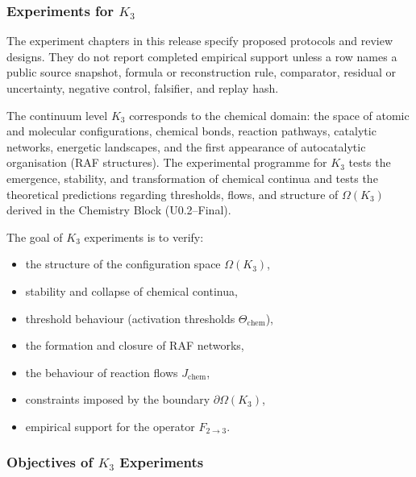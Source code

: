 
\subsubsection{Experiments for \texorpdfstring{$K_3$}{K_3}}

The experiment chapters in this release specify proposed protocols and review designs. They do not report completed empirical support unless a row names a public source snapshot, formula or reconstruction rule, comparator, residual or uncertainty, negative control, falsifier, and replay hash.
\label{sec:experiments-k3}

The continuum level $K_3$ corresponds to the chemical domain:
the space of atomic and molecular configurations, chemical bonds,
reaction pathways, catalytic networks, energetic landscapes,
and the first appearance of autocatalytic organisation (RAF structures).
The experimental programme for $K_3$ tests the emergence, stability,
and transformation of chemical continua and tests the theoretical
predictions regarding thresholds, flows, and structure of
$\Omega(K_3)$ derived in the Chemistry Block (U0.2–Final).

The goal of $K_3$ experiments is to verify:

\begin{itemize}
    \item the structure of the configuration space $\Omega(K_3)$,
    \item stability and collapse of chemical continua,
    \item threshold behaviour (activation thresholds $\Theta_{\mathrm{chem}}$),
    \item the formation and closure of RAF networks,
    \item the behaviour of reaction flows $J_{\mathrm{chem}}$,
    \item constraints imposed by the boundary $\partial \Omega(K_3)$,
    \item empirical support for the operator $F_{2\rightarrow 3}$.
\end{itemize}



\subsubsection{Objectives of \texorpdfstring{$K_3$}{K_3} Experiments}

